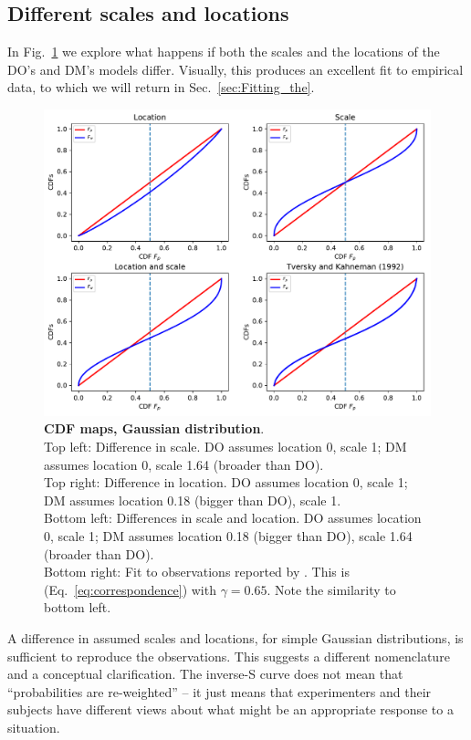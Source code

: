 \documentclass[a4paper, 12pt]{article}
\newcommand{\eref}[1]{(Eq.~\ref{eq:#1})}
\newcommand{\flabel}[1]{\label{fig:#1}}
\newcommand{\fref}[1]{Fig.~\ref{fig:#1}}
\newcommand{\seclabel}[1]{\label{sec:#1}}
\newcommand{\secref}[1]{Sec.~\ref{sec:#1}}
\begin{document}
\FloatBarrier
\subsection{Different scales and locations\seclabel{A_mismatch}}
In \fref{CDF_weights} we explore what happens if both the scales and the locations of the DO's and DM's models differ. Visually, this produces an excellent fit to empirical data, to which we will return in \secref{Fitting_the}.
 \begin{figure}
 \centering
 \includegraphics[width=1.0\textwidth]{./figs/Gauss_scale_location_both_KT.pdf}
 \caption{{\bf CDF maps, Gaussian distribution}.\\ 
 Top left: Difference in scale. DO assumes location 0, scale 1; DM assumes location 0, scale 1.64 (broader than DO).\\ 
 Top right: Difference in location. DO assumes location 0, scale 1; DM assumes location 0.18 (bigger than DO), scale 1.\\
 Bottom left: Differences in scale and location. DO assumes location 0, scale 1; DM assumes location 0.18 (bigger than DO), scale 1.64 (broader than DO).\\ 
 Bottom right: Fit to observations reported by \cite{TverskyKahneman1992}. This is \eref{correspondence} with $\gamma=0.65$.
Note the similarity to bottom left.}
 \flabel{CDF_weights}
 \end{figure}
 A difference in assumed scales and locations, for simple Gaussian distributions, is sufficient to reproduce the observations. This suggests a different nomenclature and a conceptual clarification. The inverse-S curve does not mean that ``probabilities are re-weighted'' -- it just means that experimenters and their subjects have different views about what might be an appropriate response to a situation. 
\end{document}
